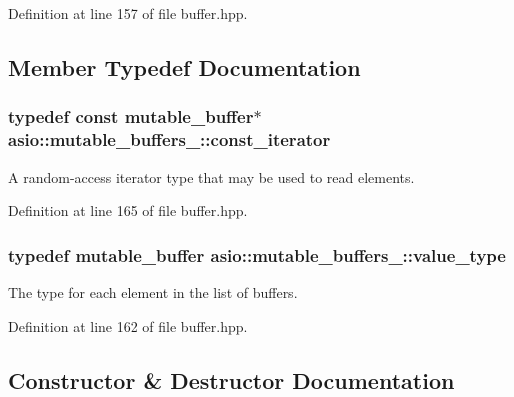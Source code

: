 Definition at line 157 of file buffer.\+hpp.



\subsection{Member Typedef Documentation}
\hypertarget{classasio_1_1mutable__buffers__1_a50acb7cfb33b2e076062b79930452b51}{}
\subsubsection[{const\+\_\+iterator}]{\setlength{\rightskip}{0pt plus 5cm}typedef const {\bf mutable\+\_\+buffer}$\ast$ {\bf asio\+::mutable\+\_\+buffers\+\_\+::const\+\_\+iterator}}\label{classasio_1_1mutable__buffers__1_a50acb7cfb33b2e076062b79930452b51}


A random-\/access iterator type that may be used to read elements. 



Definition at line 165 of file buffer.\+hpp.

\hypertarget{classasio_1_1mutable__buffers__1_ad0f0d91dda82c809af784aaedafc4890}{}
\subsubsection[{value\+\_\+type}]{\setlength{\rightskip}{0pt plus 5cm}typedef {\bf mutable\+\_\+buffer} {\bf asio\+::mutable\+\_\+buffers\+\_\+::value\+\_\+type}}\label{classasio_1_1mutable__buffers__1_ad0f0d91dda82c809af784aaedafc4890}


The type for each element in the list of buffers. 



Definition at line 162 of file buffer.\+hpp.



\subsection{Constructor \& Destructor Documentation}
\hypertarget{classasio_1_1mutable__buffers__1_a1c56a78f3d2a5a16d29293ea04ce9ba4}{}

